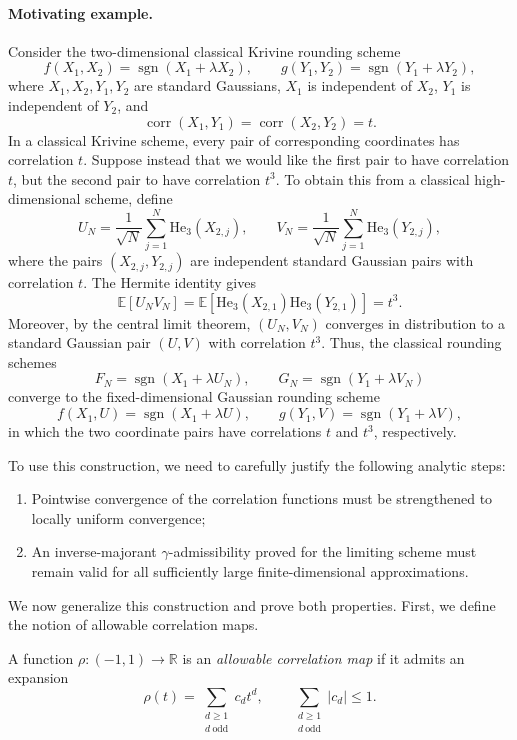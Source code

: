 \paragraph{Motivating example.}
Consider the two-dimensional classical Krivine rounding scheme
\[
f(X_1,X_2)=\operatorname{sgn}(X_1+\lambda X_2),
\qquad
g(Y_1,Y_2)=\operatorname{sgn}(Y_1+\lambda Y_2),
\]
where \(X_1,X_2,Y_1,Y_2\) are standard Gaussians, \(X_1\) is independent of \(X_2\), \(Y_1\) is independent of \(Y_2\), and
\[
\operatorname{corr}(X_1,Y_1)
=
\operatorname{corr}(X_2,Y_2)
=
t.
\]
In a classical Krivine scheme, every pair of corresponding coordinates has correlation \(t\). Suppose instead that we would like the first pair to have correlation \(t\), but the second pair to have correlation \(t^3\). To obtain this from a classical high-dimensional scheme, define
\[
U_N=\frac{1}{\sqrt N}\sum_{j=1}^N \mathrm{He}_3(X_{2,j}),
\qquad
V_N=\frac{1}{\sqrt N}\sum_{j=1}^N \mathrm{He}_3(Y_{2,j}),
\]
where the pairs \((X_{2,j},Y_{2,j})\) are independent standard Gaussian pairs with correlation \(t\). The Hermite identity gives
\[
\mathbb{E}[U_NV_N]
=
\mathbb{E}[\mathrm{He}_3(X_{2,1})\mathrm{He}_3(Y_{2,1})]
=
t^3.
\]
Moreover, by the central limit theorem, \((U_N,V_N)\) converges in distribution to a standard Gaussian pair \((U,V)\) with correlation \(t^3\). Thus, the classical rounding schemes
\[
F_N=\operatorname{sgn}(X_1+\lambda U_N),
\qquad
G_N=\operatorname{sgn}(Y_1+\lambda V_N)
\]
converge to the fixed-dimensional Gaussian rounding scheme
\[
f(X_1,U)=\operatorname{sgn}(X_1+\lambda U),
\qquad
g(Y_1,V)=\operatorname{sgn}(Y_1+\lambda V),
\]
in which the two coordinate pairs have correlations \(t\) and \(t^3\), respectively.

To use this construction, we need to carefully justify the following analytic steps:
\begin{enumerate}
    \item Pointwise convergence of the correlation functions must be strengthened to locally uniform convergence;
    \item An inverse-majorant $\gamma$-admissibility proved for the limiting scheme must remain valid for all sufficiently large finite-dimensional approximations.
\end{enumerate}

We now generalize this construction and prove both properties. First, we define the notion of allowable correlation maps.  
\begin{definition}
\label{def:allowable-correlation-map}
A function \(\rho:(-1,1)\to\mathbb{R}\) is an \emph{allowable correlation map}
if it admits an expansion
\[
\rho(t)
=
\sum_{\substack{d\geq 1\\ d\ \mathrm{odd}}} c_d t^d,
\qquad
\sum_{\substack{d\geq 1\\ d\ \mathrm{odd}}}|c_d|
\leq 1.
\]
\end{definition}

